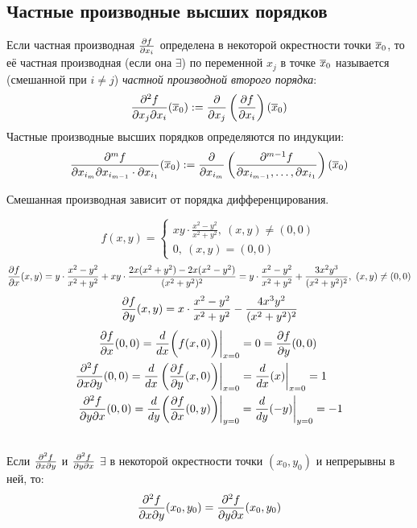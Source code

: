 \subsection{Частные производные высших порядков}
\begin{definition}
	Если частная производная $\frac{\partial f}{\partial x_i}$ определена в некоторой окрестности точки $\overline x_0$, то её частная производная (если она $\exists$) по переменной $x_j$ в точке $\overline x_0$ называется (смешанной при $i\neq j$) \textit{частной производной второго порядка}:
	\[\frac{\partial^2f}{\partial x_j\partial x_i}(\overline x_0):=\frac{\partial}{\partial x_j}\left(\frac{\partial f}{\partial x_i}\right)(\overline x_0)\]
	Частные производные высших порядков определяются по индукции:
	\[\frac{\partial^mf}{\partial x_{i_m}\partial x_{i_{m-1}}\cdot\partial x_{i_1}}(\overline x_0):=\frac{\partial}{\partial x_{i_m}}\left(\frac{\partial^{m-1}f}{\partial x_{i_{m-1}},\dots,\partial x_{i_1}}\right)(\overline x_0)\]
\end{definition}
\begin{note}
	Смешанная производная зависит от порядка дифференцирования.
\end{note}
\begin{example}
	\[
	f(x,y)=
	\begin{cases}
		xy\cdot\frac{x^2-y^2}{x^2+y^2},\ (x,y)\neq(0,0)\\
		0,\ (x,y)=(0,0)
	\end{cases}
	\]
	\[\frac{\vd f}{\vd x}(x,y)=y\cdot\frac{x^2-y^2}{x^2+y^2}+xy\cdot\frac{2x(x^2+y^2)-2x(x^2-y^2)}{(x^2+y^2)^2}=y\cdot\frac{x^2-y^2}{x^2+y^2}+\frac{3x^2y^3}{(x^2+y^2)^2},\ (x,y)\neq(0,0)\]
	\[\frac{\partial f}{\partial y}(x,y)=x\cdot\frac{x^2-y^2}{x^2+y^2}-\frac{4x^3y^2}{(x^2+y^2)^2}\]
	\begin{equation*}
		\begin{split}
			\frac{\partial f}{\partial x}(0,0)=\frac{d}{dx}\bigg(f(x,0)\bigg)&\bigg|_{x=0}=0=\frac{\partial f}{\partial y}(0,0)\\
			\frac{\partial^2f}{\partial x\partial y}(0,0)=\frac{d}{dx}\left(\frac{\partial f}{\partial y}(x,0)\right)&\bigg|_{x=0}=\frac{d}{dx}(x)\bigg|_{x=0}=1\\
			\frac{\partial^2f}{\partial y\partial x}(0,0)=\frac{d}{dy}\bigg(\frac{\partial f}{\partial x}(0,y)\bigg)&\bigg|_{y=0}=\frac{d}{dy}(-y)\bigg|_{y=0}=-1
		\end{split}
	\end{equation*}
\end{example}
\begin{theorem}\label{5_th1}\\
	Если $\frac{\partial^2f}{\partial x\partial y}$ и $\frac{\partial^2f}{\partial y\partial x}$ $\exists$ в некоторой окрестности точки $(x_0,y_0)$ и непрерывны в ней, то: 
	\[\frac{\partial^2f}{\partial x\partial y}(x_0,y_0)=\frac{\partial^2f}{\partial y\partial x}(x_0,y_0)\]
\end{theorem}
